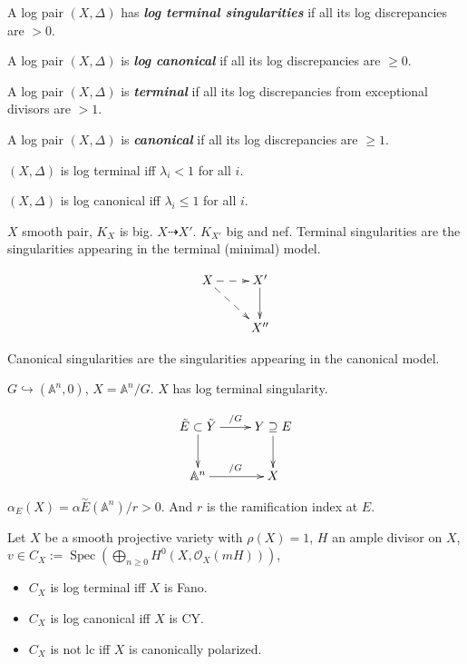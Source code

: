 \begin{definition}
\label{definition-moraga-7}
A log pair $(X,\Delta)$ has
\textit{\textbf{log terminal singularities}}
if all its log discrepancies are $>0$.

A log pair $(X,\Delta )$ is
\textit{\textbf{log canonical}} if all its
log discrepancies are $\geq 0$.

A log pair $(X,\Delta )$ is
\textit{\textbf{terminal}} if all its log
discrepancies from exceptional divisors are
$>1$.

A log pair $(X,\Delta)$ is
\textit{\textbf{canonical}} if all its log
discrepancies are $\geq 1$.
\end{definition}

\begin{exercise}
\label{exercise-moraga-1}
$(X,\Delta )$ is log terminal iff
$\lambda_{i}<1$ for all $i$.

$(X,\Delta )$ is log canonical iff
$\lambda_{i}\leq 1$ for all $i$.
\end{exercise}

\begin{remark}
\label{remark-moraga-3}
$X$ smooth pair, $K_{X}$ is big.
$X\dashrightarrow X'$. $K_{X'}$ big and nef.
{Terminal singularities are the singularities
appearing in the terminal (minimal) model.}

$$
\xymatrix{X\ar@{-->}[r]\ar@{-->}[dr]&X'
\ar[d]\\
&X''}
$$

{Canonical singularities are the
singularities appearing in the canonical
model.}
\end{remark}

\begin{example}
\label{example-moraga-5}
$G\hookrightarrow (\mathbb{A}^{n},0)$,
$X=\mathbb{A}^{n} /G$. $ X$ has log terminal
singularity.

$$
\xymatrix{\tilde{E}\subset\tilde{Y}
\ar[r]^{/G}\ar[d]&Y\supseteq
E\ar[d]\\ \mathbb{A}^{n}\ar[r]^{/G}&X}
$$

$\alpha_{E}(X)=\alpha\overset{\sim}{E}(
\mathbb{A}^{n}
)/r>0$. And $r$ is the ramification index at
$E$.
\end{example}

\begin{proposition}
\label{proposition-moraga-1}
Let $X$ be a smooth projective variety with
$\rho(X)=1$, $H$ an ample divisor on $X$,
$v\in C_{X}:=\operatorname{Spec}\left(
\bigoplus_{n\geq 0}
H^{0}(X,\mathcal{O}_{X}(mH))  \right) $,
\begin{itemize}
\item $C_{X}$ is log terminal iff $X$ is
Fano.
\item $C_{X}$ is log canonical iff $X$ is CY.
\item $C_{X}$ is not lc iff $X$ is
canonically polarized.
\end{itemize}
\end{proposition}

